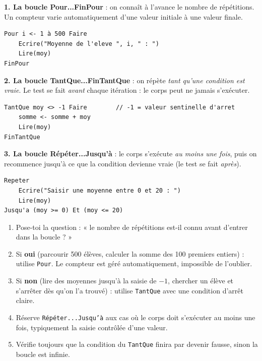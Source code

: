 \documentclass[11pt]{article}
\begin{document}
\textbf{1. La boucle Pour...FinPour} : on connaît à l'avance le nombre de répétitions. Un compteur varie automatiquement d'une valeur initiale à une valeur finale.

\begin{lstlisting}
Pour i <- 1 à 500 Faire
    Ecrire("Moyenne de l'eleve ", i, " : ")
    Lire(moy)
FinPour
\end{lstlisting}

\textbf{2. La boucle TantQue...FinTantQue} : on répète \emph{tant qu'une condition est vraie}. Le test se fait \emph{avant} chaque itération : le corps peut ne jamais s'exécuter.

\begin{lstlisting}
TantQue moy <> -1 Faire        // -1 = valeur sentinelle d'arret
    somme <- somme + moy
    Lire(moy)
FinTantQue
\end{lstlisting}

\textbf{3. La boucle Répéter...Jusqu'à} : le corps s'exécute \emph{au moins une fois}, puis on recommence jusqu'à ce que la condition devienne vraie (le test se fait \emph{après}).

\begin{lstlisting}
Repeter
    Ecrire("Saisir une moyenne entre 0 et 20 : ")
    Lire(moy)
Jusqu'a (moy >= 0) Et (moy <= 20)
\end{lstlisting}

\begin{methode}
\begin{enumerate}
\item Pose-toi la question : « le nombre de répétitions est-il connu avant d'entrer dans la boucle ? »
\item Si \textbf{oui} (parcourir 500 élèves, calculer la somme des 100 premiers entiers) : utilise \texttt{Pour}. Le compteur est géré automatiquement, impossible de l'oublier.
\item Si \textbf{non} (lire des moyennes jusqu'à la saisie de $-1$, chercher un élève et s'arrêter dès qu'on l'a trouvé) : utilise \texttt{TantQue} avec une condition d'arrêt claire.
\item Réserve \texttt{Répéter...Jusqu'à} aux cas où le corps doit s'exécuter au moins une fois, typiquement la saisie contrôlée d'une valeur.
\item Vérifie toujours que la condition du \texttt{TantQue} finira par devenir fausse, sinon la boucle est infinie.
\end{enumerate}
\end{methode}
\end{document}

